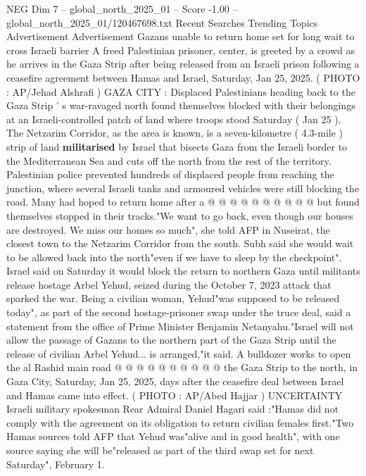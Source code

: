 \begin{textsample}{NEG Dim 7 – global\_north\_2025\_01 – Score -1.00 – global\_north\_2025\_01/120467698.txt}  \label{ex:f7_neg_184}
Recent Searches Trending Topics Advertisement Advertisement Gazans unable to return home set for long wait to cross Israeli barrier A freed Palestinian prisoner, center, is greeted by a crowd as he arrives in the Gaza Strip after being released from an Israeli prison following a ceasefire agreement between Hamas and Israel, Saturday, Jan 25, 2025. ( PHOTO : AP/Jehad Alshrafi ) GAZA CITY : Displaced Palestinians heading back to the Gaza Strip ' s war-ravaged north found themselves blocked with their belongings at an Israeli-controlled patch of land where troops stood Saturday ( Jan 25 ).
The Netzarim Corridor, as the area is known, is a seven-kilometre ( 4.3-mile ) strip of land \textbf{militarised} by Israel that bisects Gaza from the Israeli border to the Mediterranean Sea and cuts off the north from the rest of the territory.
Palestinian police prevented hundreds of displaced people from reaching the junction, where several Israeli tanks and armoured vehicles were still blocking the road.
Many had hoped to return home after a @ @ @ @ @ @ @ @ @ @ but found themselves stopped in their tracks."We want to go back, even though our houses are destroyed.
We miss our homes so much", she told AFP in Nuseirat, the closest town to the Netzarim Corridor from the south.
Subh said she would wait to be allowed back into the north"even if we have to sleep by the checkpoint".
Israel said on Saturday it would block the return to northern Gaza until militants release hostage Arbel Yehud, seized during the October 7, 2023 attack that sparked the war.
Being a civilian woman, Yehud"was supposed to be released today", as part of the second hostage-prisoner swap under the truce deal, said a statement from the office of Prime Minister Benjamin Netanyahu."Israel will not allow the passage of Gazans to the northern part of the Gaza Strip until the release of civilian Arbel Yehud... is arranged,"it said.
A bulldozer works to open the al Rashid main road @ @ @ @ @ @ @ @ @ @ the Gaza Strip to the north, in Gaza City, Saturday, Jan 25, 2025, days after the ceasefire deal between Israel and Hamas came into effect. ( PHOTO : AP/Abed Hajjar ) UNCERTAINTY Israeli military spokesman Rear Admiral Daniel Hagari said :"Hamas did not comply with the agreement on its obligation to return civilian females first."Two Hamas sources told AFP that Yehud was"alive and in good health", with one source saying she will be"released as part of the third swap set for next Saturday", February 1.

\end{textsample}
